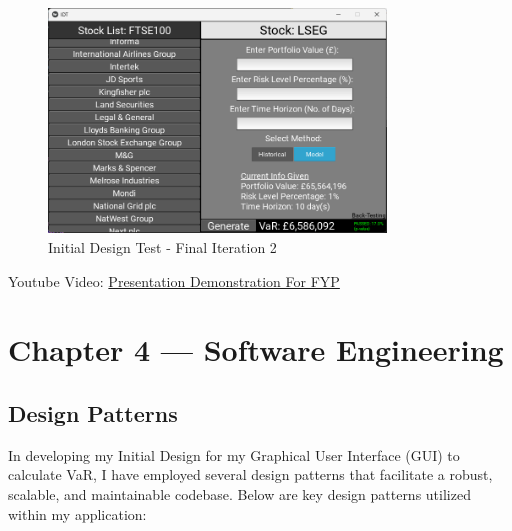 \documentclass{article}
\begin{document}
\begin{figure}[h!]
  \centering
  \includegraphics[width=0.8\textwidth]{Images/Initial Design Tes - Final Iteration 2.png}
  \caption{Initial Design Test - Final Iteration 2}
  \label{fig:Initial Design Test - Final Iteration 2}
\end{figure}

Youtube Video: \href{https://youtu.be/2GIWug_IESI}{Presentation Demonstration For FYP}




\section{Chapter 4 --- Software Engineering}

\subsection{Design Patterns}

In developing my Initial Design for my Graphical User Interface (GUI) to calculate VaR, I have employed several design patterns that facilitate a robust, scalable, and maintainable codebase. Below are key design patterns utilized within my application:\\\vspace{0.3cm}
\end{document}

